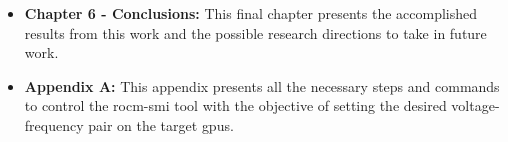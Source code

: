 \begin{itemize}
    \item \textbf{Chapter 6 - Conclusions:} This final chapter presents the accomplished results from this work and the possible research directions to take in future work.
    \item \textbf{Appendix A:} This appendix presents all the necessary steps and commands to control the rocm-smi tool with the objective of setting the desired voltage-frequency pair on the target \acrshort{gpu}s.
\end{itemize}


